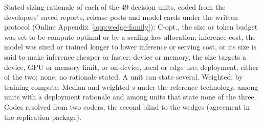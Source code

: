 \begin{table}[tp]
\centering
\caption{Stated Sizing Rationales by Release Year}
\label{tab:app-rationale}
\footnotesize
\setlength{\tabcolsep}{2.5pt}
\medskip
\begin{tablenotes}
Stated sizing rationale of each of the 49 decision units, coded from the developers' saved reports, release posts and model cards under the written protocol (Online Appendix~\ref{app:wedge-family}): C-opt., the size or token budget was set to be compute-optimal or by a scaling-law allocation; inference cost, the model was sized or trained longer to lower inference or serving cost, or its size is said to make inference cheaper or faster; device or memory, the size targets a device, GPU or memory limit, or on-device, local or edge use; deployment, either of the two; none, no rationale stated. A unit can state several. Weighted: by training compute. Median and weighted $s$ under the reference technology, among units with a deployment rationale and among units that state none of the three. Codes resolved from two coders, the second blind to the wedges (agreement in the replication package).
\end{tablenotes}
\end{table}
